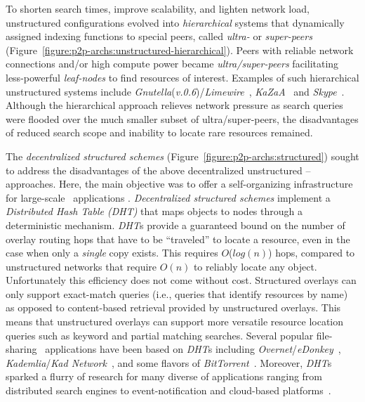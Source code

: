 
To shorten search times, improve scalability, and lighten network load, 
unstructured configurations evolved into \emph{hierarchical} systems 
that dynamically assigned indexing functions to special peers, 
called \emph{ultra-}  or \emph{super-peers} 
(Figure~\ref{figure:p2p-archs:unstructured-hierarchical}). 
Peers with reliable network connections and/or high compute power 
became \emph{ultra/super-peers}
facilitating less-powerful \emph{leaf-nodes} to find resources of
interest. 
Examples of such hierarchical unstructured systems include
{\sl Gnutella}(\emph{v.0.6})/{\sl Limewire}~\cite{gnutella}, 
{\sl KaZaA}~\cite{kazaa} and {\sl Skype}~\cite{skype}. 
Although the hierarchical approach relieves network pressure as
search queries were flooded over the much smaller subset of 
ultra/super-peers, the disadvantages of reduced search scope and 
inability to locate rare resources remained.

The \emph{decentralized structured schemes}
(Figure~\ref{figure:p2p-archs:structured}) sought to address the 
disadvantages of the above decentralized unstructured \p--approaches.
Here, the main objective was to offer 
a self-organizing infrastructure for large-scale \p\ applications
\cite{ratnasamy_can_2001,stoica_chord_2001,antony_pastry_2001,zhao_tapestry_2001,maymounkov_kademlia_2002,rgrk_bamboo_2004}.
\emph{Decentralized structured schemes}
implement a \emph{Distributed Hash Table (DHT)} that maps objects 
to nodes through a deterministic mechanism. 
\emph{DHT}s provide a guaranteed bound on the
number of overlay routing hops that have to be ``traveled''
to locate a resource, even in the case when only a \emph{single} copy exists.  
This requires
$O$($log(n)$) hops, compared to unstructured networks that require
$O(n)$ to reliably locate any object. 
Unfortunately this efficiency does not come without cost. 
Structured overlays can only support exact-match queries 
(i.e., queries that identify resources by name) as opposed
to content-based retrieval provided by unstructured overlays. 
This means that unstructured overlays can support more versatile 
resource location queries such as keyword and partial matching searches. 
Several popular file-sharing
\p\ applications have been based on \emph{DHT}s including
{\sl Overnet}/{\sl eDonkey}~\cite{overnet}, 
{\sl Kademlia}/{\sl Kad Network}~\cite{maymounkov_kademlia_2002},  and 
some flavors of {\sl BitTorrent}~\cite{c_bittorrent_2003}.  
Moreover, \emph{DHT}s sparked
a flurry of research for many diverse of applications ranging
from distributed search engines to event-notification and cloud-based
platforms~\cite{kbc_oceanstore_2000,rkcd_scribe_2001,mgpj_cloudsnap_2011}.

